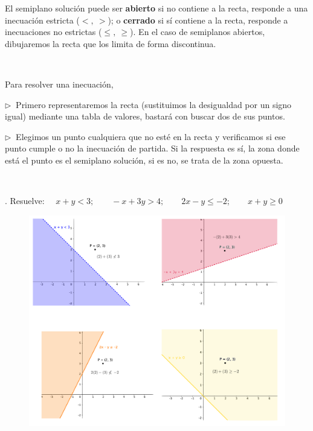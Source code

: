 \vspace{5mm}
El semiplano solución puede ser \textbf{abierto} si no contiene a la recta, responde a una inecuación estricta ($<,\ >$); o \textbf{cerrado} si sí contiene a la recta, responde a inecuaciones no estrictas ($\le,\ \ge$). En el caso de semiplanos abiertos, dibujaremos la recta que los limita de forma discontinua.

\vspace{5mm}
\begin{destacado}
$\ $

Para resolver una inecuación,

\begin{adjustwidth}{20pt}{10pt}
\vspace{4mm} $\triangleright \ $ Primero representaremos la recta (sustituimos la desigualdad por un signo igual) mediante una tabla de valores, bastará con buscar dos de sus puntos.

\vspace{4mm} $\triangleright \ $ Elegimos un punto cualquiera que no esté en la recta y verificamos si ese punto cumple o no la inecuación de partida. Si la respuesta es sí, la zona donde está el punto es el semiplano solución, si es no, se trata de la zona opuesta.	

$\ $
\end{adjustwidth}

\end{destacado}

\vspace{5mm}
\begin{miejemplo}
.	Resuelve: $\quad x+y<3;\qquad -x+3y>4;\qquad 2x-y\le -2;\qquad x+y\ge 0$	


\begin{figure}[H]
	\centering
	\includegraphics[width=1\textwidth]{imagenes/img07.png}
\end{figure}
\end{miejemplo}

